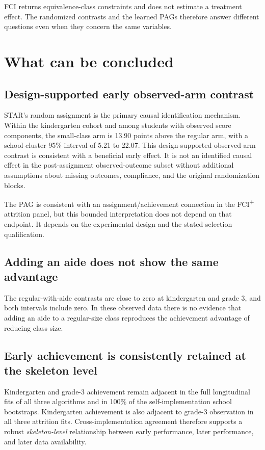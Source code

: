 \documentclass[11pt,a4paper,oneside]{report}
\newcommand{\FCIplus}{FCI\textsuperscript{+}}
\begin{document}
FCI returns equivalence-class constraints and does not estimate a treatment
effect.  The randomized contrasts and the learned PAGs therefore answer
different questions even when they concern the same variables.

\section{What can be concluded}

\subsection{Design-supported early observed-arm contrast}

STAR's random assignment is the primary causal identification mechanism.
Within the kindergarten cohort and among students with observed score
components, the small-class arm is 13.90 points above the regular arm, with a
school-cluster 95\% interval of 5.21 to 22.07. This design-supported
observed-arm contrast is consistent with a beneficial early effect. It is not
an identified causal effect in the post-assignment observed-outcome subset
without additional assumptions about missing outcomes, compliance, and the
original randomization blocks.

The PAG is consistent with an assignment/achievement connection in the
\FCIplus{} attrition panel, but this bounded interpretation does not depend on
that endpoint. It depends on the experimental design and the stated selection
qualification.

\subsection{Adding an aide does not show the same advantage}

The regular-with-aide contrasts are close to zero at kindergarten and grade 3,
and both intervals include zero. In these observed data there is no evidence
that adding an aide to a regular-size class reproduces the achievement
advantage of reducing class size.

\subsection{Early achievement is consistently retained at the skeleton level}

Kindergarten and grade-3 achievement remain adjacent in the full longitudinal
fits of all three algorithms and in 100\% of the self-implementation school
bootstraps. Kindergarten achievement is also adjacent to grade-3 observation
in all three attrition fits. Cross-implementation agreement therefore supports
a robust \emph{skeleton-level} relationship between early performance, later
performance, and later data availability.
\end{document}
